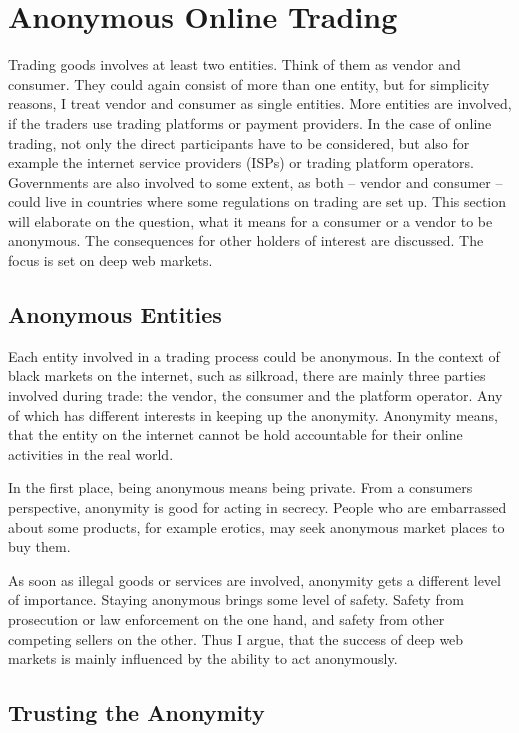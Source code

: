 \section{Anonymous Online Trading}
\label{trading}

Trading goods involves at least two entities. Think of them as vendor and consumer. They could again consist of more than one entity, but for simplicity reasons, I treat vendor and consumer as single entities. More entities are involved, if the traders use trading platforms or payment providers. In the case of online trading, not only the direct participants have to be considered, but also for example the internet service providers (ISPs) or trading platform operators. Governments are also involved to some extent, as both -- vendor and consumer -- could live in countries where some regulations on trading are set up.
This section will elaborate on the question, what it means for a consumer or a vendor to be anonymous. The consequences for other holders of interest are discussed. The focus is set on deep web markets.

\subsection{Anonymous Entities}

Each entity involved in a trading process could be anonymous. In the context of black markets on the internet, such as silkroad\cite{silkroad2013}, there are mainly three parties involved during trade: the vendor, the consumer and the platform operator. Any of which has different interests in keeping up the anonymity. Anonymity means, that the entity on the internet cannot be hold accountable for their online activities in the real world\cite{accountability2014}.

In the first place, being anonymous means being private. From a consumers perspective, anonymity is good for acting in secrecy. People who are embarrassed about some products, for example erotics, may seek anonymous market places to buy them.

As soon as illegal goods or services are involved, anonymity gets a different level of importance. Staying anonymous brings some level of safety. Safety from prosecution or law enforcement on the one hand, and safety from other competing sellers on the other. Thus I argue, that the success of deep web markets is mainly influenced by the ability to act anonymously.


\subsection{Trusting the Anonymity}

